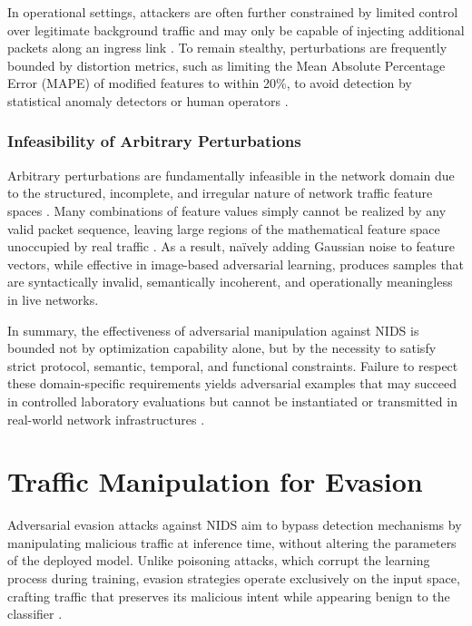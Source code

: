 In operational settings, attackers are often further constrained by limited control over legitimate background traffic and may only be capable of injecting additional packets along an ingress link \cite{rubinstein2009antidote}. 
To remain stealthy, perturbations are frequently bounded by distortion metrics, such as limiting the Mean Absolute Percentage Error (MAPE) of modified features to within 20\%, to avoid detection by statistical anomaly detectors or human operators \cite{zhang2022adversarial}.

\subsubsection{Infeasibility of Arbitrary Perturbations}

Arbitrary perturbations are fundamentally infeasible in the network domain due to the structured, incomplete, and irregular nature of network traffic feature spaces \cite{he2023adversarial}. 
Many combinations of feature values simply cannot be realized by any valid packet sequence, leaving large regions of the mathematical feature space unoccupied by real traffic \cite{yang2025robustness}. 
As a result, naïvely adding Gaussian noise to feature vectors, while effective in image-based adversarial learning, produces samples that are syntactically invalid, semantically incoherent, and operationally meaningless in live networks.

In summary, the effectiveness of adversarial manipulation against NIDS is bounded not by optimization capability alone, but by the necessity to satisfy strict protocol, semantic, temporal, and functional constraints. 
Failure to respect these domain-specific requirements yields adversarial examples that may succeed in controlled laboratory evaluations but cannot be instantiated or transmitted in real-world network infrastructures \cite{merzouk2022investigating}.


\section{Traffic Manipulation for Evasion}

Adversarial evasion attacks against NIDS aim to bypass detection mechanisms by manipulating malicious traffic at inference time, without altering the parameters of the deployed model. Unlike poisoning attacks, which corrupt the learning process during training, evasion strategies operate exclusively on the input space, crafting traffic that preserves its malicious intent while appearing benign to the classifier \cite{huang2011adversarial, hashemi2020enhancing}.

